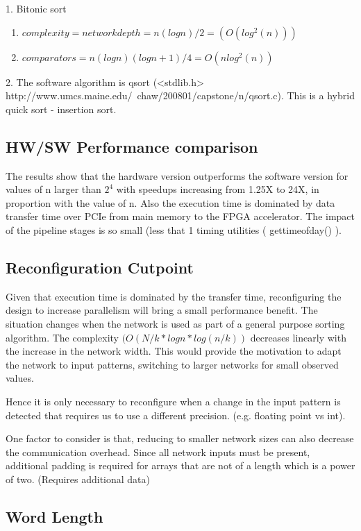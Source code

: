 1. Bitonic sort
\begin{enumerate}
\item $complexity = network depth = n(logn)/2 =  (O(log^2(n)))  $
\item $ comparators = n (logn) (logn + 1) / 4 = O(nlog^2(n)) $
\end{enumerate}


2. The software algorithm is qsort (<stdlib.h>
http://www.umcs.maine.edu/~chaw/200801/capstone/n/qsort.c). This is a
hybrid quick sort - insertion sort.


\subsection{HW/SW Performance comparison}

The results show that the hardware version outperforms the software
version for values of n larger than $2^4$ with speedups increasing from
1.25X to 24X, in proportion with the value of n.  Also the execution
time is dominated by data transfer time over PCIe from main memory to
the FPGA accelerator. The impact of the pipeline stages is so small
(less that 1%
timing utilities ( gettimeofday() ).

\subsection{Reconfiguration Cutpoint}

Given that execution time is dominated by the transfer time,
reconfiguring the design to increase parallelism will bring a small
performance benefit.  The situation changes when the network is used
as part of a general purpose sorting algorithm. The complexity $( O(N/k
* logn * log(n/k)) $ decreases linearly with the increase in the network
width. This would provide the motivation to adapt the network to input
patterns, switching to larger networks for small observed values.

Hence it is only necessary to reconfigure when a change in the input
pattern is detected that requires us to use a different
precision. (e.g. floating point vs int).

One factor to consider is that, reducing to smaller network sizes can
also decrease the communication overhead. Since all network inputs
must be present, additional padding is required for arrays that are
not of a length which is a power of two. (Requires additional data)


\subsection{Word Length}

